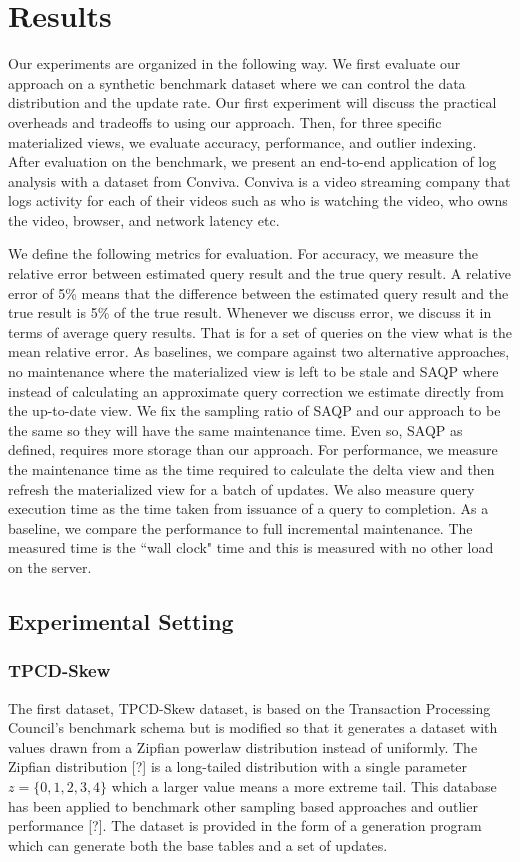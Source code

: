 \section{Results}
\label{exp}
Our experiments are organized in the following way.
We first evaluate our approach on a synthetic benchmark dataset where we can control the data distribution and the update rate.
Our first experiment will discuss the practical overheads and tradeoffs to using our approach.
Then, for three specific materialized views, we evaluate accuracy, performance, and outlier indexing.
After evaluation on the benchmark, we present an end-to-end application of log analysis with a dataset from Conviva.
Conviva is a video streaming company that logs activity for each of their videos such as who is watching the video, who owns the video, browser, and network latency etc. 

We define the following metrics for evaluation.
For accuracy, we measure the relative error between estimated query result and the true query result.
A relative error of 5\% means that the difference between the estimated query result and the true result is 5\% of the true result.
Whenever we discuss error, we discuss it in terms of average query results. 
That is for a set of queries on the view what is the mean relative error. 
As baselines, we compare against two alternative approaches, no maintenance where the materialized view is left to be stale and SAQP where instead 
of calculating an approximate query correction we estimate directly from the up-to-date view.
We fix the sampling ratio of SAQP and our approach to be the same so they will have the same maintenance time.
Even so, SAQP as defined, requires more storage than our approach.
For performance, we measure the maintenance time as the time required to calculate the delta view and then refresh the materialized view for a batch of updates.
We also measure query execution time as the time taken from issuance of a query to completion.
As a baseline, we compare the performance to full incremental maintenance.
The measured time is the ``wall clock" time and this is measured with no other load on the server.

\subsection{Experimental Setting}
\subsubsection{TPCD-Skew}
The first dataset, TPCD-Skew dataset, is based on the Transaction Processing Council's benchmark
schema but is modified so that it generates a dataset with values drawn from a Zipfian powerlaw distribution instead of uniformly.
The Zipfian distribution [?] is a long-tailed distribution with a single parameter $z=\{0,1,2,3,4\}$ which a larger
value means a more extreme tail.
This database has been applied to benchmark other sampling based approaches and outlier performance [?].
The dataset is provided in the form of a generation program which can generate both the base tables and a set of updates.

